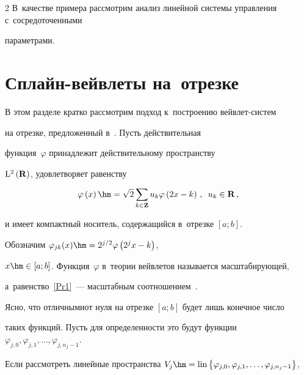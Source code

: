 \begin{multicols}{2}
В~качестве примера рассмотрим анализ линейной системы управления  с~сосредоточенными 


параметрами.





\section{Сплайн-вейвлеты на~отрезке}





В этом разделе  кратко рассмотрим подход к~построению вейв\-лет-сис\-тем 


на отрезке, предложенный в~\cite{ArticleFinkelstein}. Пусть действительная 


функция~$\varphi $ принадлежит действительному пространству 


$\mathrm{L}^{2} \left({\bf R}\right)$, удовлетво\-ряет равенству


\begin{equation} 


\label{Pr1}


\varphi \left(x\right)\hm=\sqrt{2} \sum\limits_{k\in {\bf Z}}u_{k} 


\varphi \left(2x-k\right)\,,\enskip u_{k} \in \mathbf{R}\,,


\end{equation}


и имеет компактный носитель, содержащийся в~отрезке $[a;b]$. 


Обозначим $\varphi _{jk} (x)\hm=2^{{j}/{2}}\varphi \left(2^{j} x-k\right)$,


$x\hm\in [a;b]$. Функция~$\varphi $ в~теории вейвлетов называ\-ется масштабирующей,


 а~равенство~\eqref{Pr1}~--- масштаб\-ным соотношением~\cite{Frazer}. 


 Ясно, что отличными\linebreak от нуля на отрезке $[a;b]$ будет лишь конечное чис\-ло


  таких функций. Пусть для определенности это будут функции $\varphi _{j,0},


\varphi _{j,1} ,\ldots,\varphi _{j,n_{j} -1}$. 





Если рассмотреть линейные пространства $ V_{j} \hm= \mathrm{lin}


\left\{\varphi _{j,0} ,\varphi _{j,1} ,\ldots,\varphi _{j,n_{j} -1} \right\}$,



\end{multicols}
